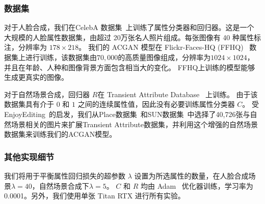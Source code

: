 \subsubsection{数据集}
对于人脸合成，我们在CelebA 数据集~\cite{celeba}上训练了属性分类器和回归器。这是一个大规模的人脸属性数据集，由超过 20万张名人照片组成。每张图像有 40 种属性标注，分辨率为 $178\times218$。 我们的 ACGAN 模型在 Flickr-Faces-HQ (FFHQ)~\cite{stylegan} 数据集上进行训练，该数据集由$70,000$的高质量图像组成，分辨率为$1024\times1024$，并且在年龄、人种和图像背景方面包含相当大的变化。 FFHQ上训练的模型能够生成更真实的图像。

对于自然场景合成，回归器 $R$在 Transient Attribute Database~\cite{scenedataset} 上训练。 由于该数据集具有介于 $0$ 和 $1$ 之间的连续属性值，因此没有必要训练属性分类器 $C$。 受EnjoyEditing~\cite{iclr2021}的启发，我们从Place数据集~\cite{place}和SUN数据集~\cite{sun}中选择了40,726张与自然场景相关的图片来扩展Transient Attribute数据集，并利用这个增强的自然场景数据集来训练我们的ACGAN模型。


\subsubsection{其他实现细节}
我们将用于平衡属性回归损失的超参数 $\lambda$ 设置为所选属性的数量，在人脸合成场景$\lambda=40$，自然场景合成下$\lambda=5$。 $C$ 和 $R$ 均由 Adam~\cite{adam} 优化器训练，学习率为 0.0001。另外，我们使用单张 Titan RTX 进行所有实验。

